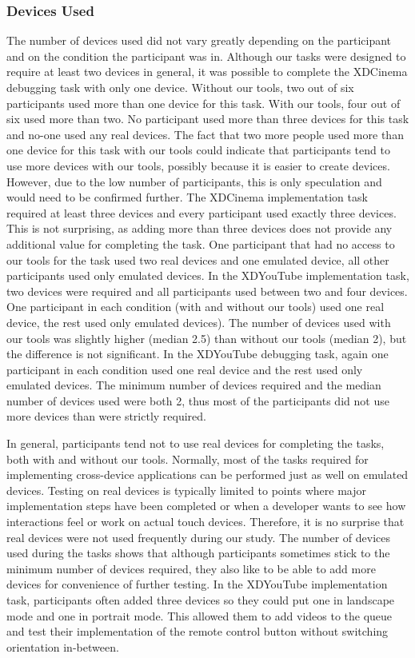 \subsubsection{Devices Used}

The number of devices used did not vary greatly depending on the participant and on the condition the participant was in. Although our tasks were designed to require at least two devices in general, it was possible to complete the XDCinema debugging task with only one device. Without our tools, two out of six participants used more than one device for this task. With our tools, four out of six used more than two. No participant used more than three devices for this task and no-one used any real devices. The fact that two more people used more than one device for this task with our tools could indicate that participants tend to use more devices with our tools, possibly because it is easier to create devices. However, due to the low number of participants, this is only speculation and would need to be confirmed further. The XDCinema implementation task required at least three devices and every participant used exactly three devices. This is not surprising, as adding more than three devices does not provide any additional value for completing the task. One participant that had no access to our tools for the task used two real devices and one emulated device, all other participants used only emulated devices. In the XDYouTube implementation task, two devices were required and all participants used between two and four devices. One participant in each condition (with and without our tools) used one real device, the rest used only emulated devices). The number of devices used with our tools was slightly higher (median 2.5) than without our tools (median 2), but the difference is not significant. In the XDYouTube debugging task, again one participant in each condition used one real device and the rest used only emulated devices. The minimum number of devices required and the median number of devices used were both 2, thus most of the participants did not use more devices than were strictly required.

In general, participants tend not to use real devices for completing the tasks, both with and without our tools. Normally, most of the tasks required for implementing cross-device applications can be performed just as well on emulated devices. Testing on real devices is typically limited to points where major implementation steps have been completed or when a developer wants to see how interactions feel or work on actual touch devices. Therefore, it is no surprise that real devices were not used frequently during our study. The number of devices used during the tasks shows that although participants sometimes stick to the minimum number of devices required, they also like to be able to add more devices for convenience of further testing. In the XDYouTube implementation task, participants often added three devices so they could put one in landscape mode and one in portrait mode. This allowed them to add videos to the queue and test their implementation of the remote control button without switching orientation in-between. 

